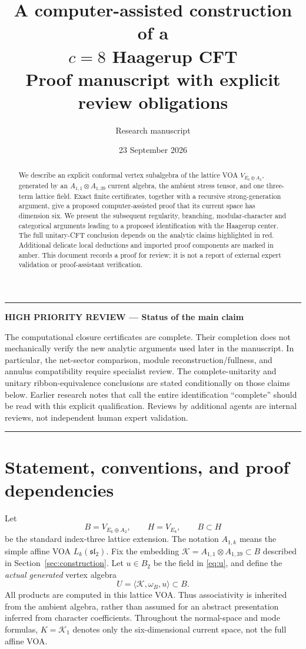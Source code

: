 \documentclass[11pt,a4paper]{article}
\title{A computer-assisted construction of a\\[3pt]
  \texorpdfstring{\(c=8\)}{c=8} Haagerup CFT\\[5pt]
  \large Proof manuscript with explicit review obligations}
\author{Research manuscript}
\date{23 September 2026}
\theoremstyle{definition}
\newenvironment{criticalnote}[1]{\par\addvspace{8pt}\begingroup
  \color{BrickRed}\noindent\rule{\linewidth}{1pt}\par\nobreak
  \noindent\textbf{HIGH PRIORITY REVIEW --- #1}\par\nobreak\small\noindent\ignorespaces
}{\par\noindent\rule{\linewidth}{1pt}\par\endgroup\addvspace{8pt}}
\begin{document}
\maketitle
\begin{abstract}
We describe an explicit conformal vertex subalgebra of the lattice VOA
\(V_{E_6\oplus A_2}\), generated by an \(A_{1,1}\otimes A_{1,39}\)
current algebra, the ambient stress tensor, and one three-term lattice field.
Exact finite certificates, together with a recursive strong-generation
argument, give a proposed computer-assisted proof that its current space
has dimension six. We present the subsequent regularity, branching,
modular-character and categorical arguments leading to a proposed
identification with the Haagerup center. The full unitary-CFT conclusion
depends on the analytic claims highlighted in red. Additional delicate
local deductions and imported proof components are marked in amber.
This document records a proof for review; it is not a report of external
expert validation or proof-assistant verification.
\end{abstract}

\begin{criticalnote}{Status of the main claim}
The computational closure certificates are complete. Their completion
does not mechanically verify the new analytic arguments used later in
the manuscript. In particular, the net-sector comparison, module
reconstruction/fullness, and annulus compatibility require specialist
review. The complete-unitarity and unitary ribbon-equivalence conclusions
are stated conditionally on those claims below. Earlier research notes
that call the entire identification ``complete'' should be read with
this explicit qualification. Reviews by additional agents are internal
reviews, not independent human expert validation.
\end{criticalnote}

\clearpage
\tableofcontents
\clearpage

\section{Statement, conventions, and proof dependencies}
\label{sec:statement}

Let
\[
 B=V_{E_6\oplus A_2},\qquad H=V_{E_8},\qquad B\subset H
\]
be the standard index-three lattice extension. The notation \(A_{1,k}\)
means the simple affine VOA \(L_k(\mathfrak{sl}_2)\). Fix the embedding
\(\mathcal K=A_{1,1}\otimes A_{1,39}\subset B\) described in
Section~\ref{sec:construction}. Let \(u\in B_2\) be the field in
\eqref{eq:u}, and define the \emph{actual generated} vertex algebra
\begin{equation}\label{eq:U}
 U=\langle\mathcal K,\omega_B,u\rangle\subset B.
\end{equation}
All products are computed in this lattice VOA. Thus associativity is
inherited from the ambient algebra, rather than assumed for an abstract
presentation inferred from character coefficients.
Throughout the normal-space and mode formulas, \(K=\mathcal K_1\)
denotes only the six-dimensional current space, not the full affine VOA.
\end{document}
